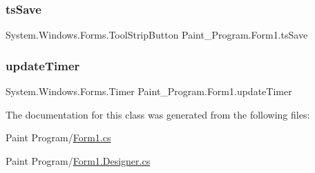 \mbox{\label{class_paint___program_1_1_form1_a4624b2b2d1e12703beaf5eb4c0d9ed43}} 
\subsubsection{\texorpdfstring{ts\+Save}{tsSave}}
{\footnotesize\ttfamily System.\+Windows.\+Forms.\+Tool\+Strip\+Button Paint\+\_\+\+Program.\+Form1.\+ts\+Save\hspace{0.3cm}{\ttfamily [private]}}

\mbox{\label{class_paint___program_1_1_form1_acecdd498b40a257daf3424d49e172a9d}} 
\subsubsection{\texorpdfstring{update\+Timer}{updateTimer}}
{\footnotesize\ttfamily System.\+Windows.\+Forms.\+Timer Paint\+\_\+\+Program.\+Form1.\+update\+Timer\hspace{0.3cm}{\ttfamily [private]}}



The documentation for this class was generated from the following files\+:\begin{DoxyCompactItemize}
\item 
Paint Program/\mbox{\hyperlink{_form1_8cs}{Form1.\+cs}}\item 
Paint Program/\mbox{\hyperlink{_form1_8_designer_8cs}{Form1.\+Designer.\+cs}}\end{DoxyCompactItemize}
